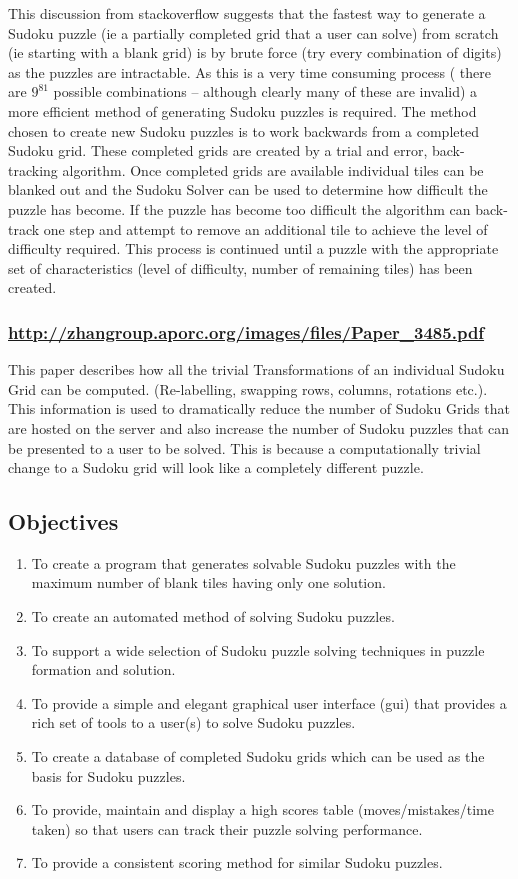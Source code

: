 \documentclass[fleqn]{article}
\begin{document}
This discussion from stackoverflow suggests that the fastest way to generate a Sudoku puzzle (ie a partially completed grid that a user can solve) from scratch (ie starting with a blank grid) is by brute force (try every combination of digits) as the puzzles are intractable. As this is a very time consuming process ( there are $9^{81}$ possible combinations – although clearly many of these are invalid) a more efficient method of generating Sudoku puzzles is required.
The method chosen to create new Sudoku puzzles is to work backwards from a completed Sudoku grid. These completed grids are created by a trial and error, back-tracking algorithm. Once completed grids are available individual tiles can be blanked out and the Sudoku Solver can be used to determine how difficult the puzzle has become. If the puzzle has become too difficult the algorithm can back-track one step and attempt to remove an additional tile to achieve the level of difficulty required. This process is continued until a puzzle with the appropriate set of characteristics (level of difficulty, number of remaining tiles) has been created.

\subsubsection*{\url{http://zhangroup.aporc.org/images/files/Paper_3485.pdf}}
This paper describes how all the trivial Transformations of an individual Sudoku Grid can be computed. (Re-labelling, swapping rows, columns, rotations etc.). This information is used to dramatically reduce the number of Sudoku Grids that are hosted on the server and also increase the number of Sudoku puzzles that can be presented to a user to be solved. This is because a computationally trivial change to a Sudoku grid will look like a completely different puzzle.

\subsection{Objectives}
\begin{enumerate}
\item To create a program that generates solvable Sudoku puzzles with the maximum number of blank tiles having only one solution.
\item To create an automated method of solving Sudoku puzzles.
\item To support a wide selection of Sudoku puzzle solving techniques in puzzle formation and solution.
\item To provide a simple and elegant graphical user interface (gui) that provides a rich set of tools to a user(s) to solve Sudoku puzzles.
\item To create a database of completed Sudoku grids which can be used as the basis for Sudoku puzzles.
\item To provide, maintain and display a high scores table (moves/mistakes/time taken) so that users can track their puzzle solving performance.
\item To provide a consistent scoring method for similar Sudoku puzzles.
\end{enumerate}
\end{document}
